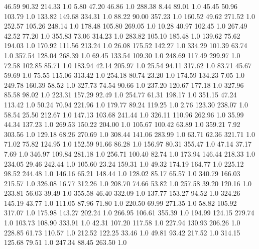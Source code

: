    46.59    90.32   214.33  1.0
    5.80    47.20    46.86  1.0
  288.38     8.44    89.01  1.0
   45.45    50.96   103.79  1.0
  133.82   149.68   334.31  1.0
   88.22    90.00   357.23  1.0
  160.52    49.62   271.52  1.0
  252.57   105.26   248.14  1.0
  178.48   105.80   269.05  1.0
   10.28    40.97   102.45  1.0
  267.49    42.52    77.20  1.0
  355.83    73.06   314.23  1.0
  283.82   105.10   185.48  1.0
  139.62    75.62   194.03  1.0
  170.92   111.56   213.24  1.0
   26.08   175.52   142.27  1.0
  334.29   101.39    63.74  1.0
  357.54   128.04   268.39  1.0
   69.45   133.54   109.30  1.0
  248.69   117.49   299.97  1.0
   72.58   102.85    85.71  1.0
  183.94    42.14   205.97  1.0
   25.54    94.11   317.62  1.0
   83.71    45.67    59.69  1.0
   75.55   115.06   313.42  1.0
  254.18    80.74    23.20  1.0
  174.59   134.23     7.05  1.0
  249.78   160.39    58.52  1.0
  327.73    74.54    90.66  1.0
  237.20   120.67   177.18  1.0
  327.96    85.58    98.02  1.0
  223.31   157.29    92.49  1.0
  254.77    61.31   198.17  1.0
  351.15    47.24   113.42  1.0
   50.24    70.94   221.96  1.0
  179.77    89.24   119.25  1.0
    2.76   123.30   238.07  1.0
   58.54    25.50   212.67  1.0
  147.13   103.68   241.44  1.0
  326.11   110.96   262.96  1.0
   35.99    44.34   137.23  1.0
  269.53   150.22   204.00  1.0
  105.67   100.42    63.89  1.0
  359.21     7.92   303.56  1.0
  129.18    68.26   270.69  1.0
  308.44   141.06   283.99  1.0
   63.71    62.36   321.71  1.0
   71.02    75.82   124.95  1.0
  152.59    91.66    86.28  1.0
  156.97    80.31   355.47  1.0
   47.14    37.17     7.69  1.0
  346.97   109.84   281.18  1.0
  256.71   100.40    82.74  1.0
  173.94   146.44   218.33  1.0
  234.05    29.46   242.44  1.0
  105.60    23.24   159.31  1.0
   49.32   174.19   164.77  1.0
  225.12    98.52   244.48  1.0
  146.16    65.21   148.44  1.0
  128.02    85.17    65.57  1.0
  340.79   166.03   215.57  1.0
  326.08    16.77   312.26  1.0
  208.70    74.66    53.82  1.0
  257.58    39.20   120.16  1.0
  233.81    56.03    39.49  1.0
  355.58    46.40   332.09  1.0
  137.77   153.27    94.52  1.0
  324.26   145.19    43.77  1.0
  111.05    87.96    71.80  1.0
  220.50    69.99   271.35  1.0
   58.82   105.92   317.07  1.0
  175.98   143.27   202.24  1.0
  266.95   106.61   355.39  1.0
  194.99   124.15   279.74  1.0
  103.73   108.90   333.91  1.0
   42.31   107.20   117.58  1.0
  227.94   130.93   206.26  1.0
  228.85    61.73   110.57  1.0
  212.52   122.25    33.46  1.0
   49.81    93.42   217.52  1.0
  314.15   125.68    79.51  1.0
  247.34    88.45   263.50  1.0
